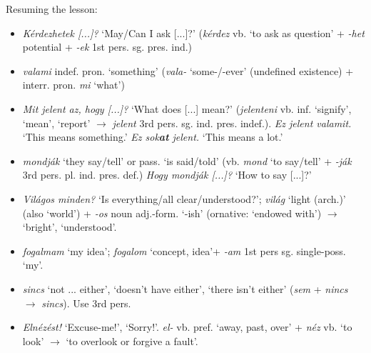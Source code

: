 \documentclass[a4paper,11pt]{article}
\begin{document}
\noindent Resuming the lesson:
\begin{itemize}

  \item \emph{Kérdezhetek [...]?} `May/Can I ask [...]?'
    (\emph{kérdez} vb. `to ask as question' + \emph{-het} potential +
    \emph{-ek} 1st pers. sg. pres. ind.)

  \item \emph{valami} indef. pron. `something' (\emph{vala-}
    `some-/-ever' (undefined existence) + interr. pron. \emph{mi}
    `what')

  \item \emph{Mit jelent az, hogy [...]?}  `What does [...] mean?'
    (\emph{jelenteni} vb. inf. `signify', `mean', `report'
    $\rightarrow$ \emph{jelent} 3rd
    pers. sg. ind. pres. indef.). \emph{Ez jelent valamit.} `This
    means something.' \emph{Ez sok\textbf{at} jelent.} `This means a
    lot.'

  \item \emph{mondják} `they say/tell' or pass. `is said/told'
    (vb. \emph{mond} `to say/tell' + \emph{-ják} 3rd
    pers. pl. ind. pres. def.) \emph{Hogy mondják [...]?} `How to say
    [...]?'

  \item \emph{Világos minden?} `Is everything/all clear/understood?';
    \emph{világ} `light (arch.)' (also `world') + \emph{-os} noun
    adj.-form. `-ish' (ornative: `endowed with') $\rightarrow$
    `bright', `understood'.

  \item \emph{fogalmam} `my idea'; \emph{fogalom} `concept, idea'+
    \emph{-am} 1st pers sg. single\hyp{}poss. `my'.

  \item \emph{sincs} `not ... either', `doesn't have either', `there
    isn't either' (\emph{sem} + \emph{nincs} $\rightarrow$
    \emph{sincs}). Use 3rd pers.

    \item \emph{Elnézést!} `Excuse-me!', `Sorry!'. \emph{el-}
      vb. pref. `away, past, over' + \emph{néz} vb. `to look'
      $\rightarrow$ `to overlook or forgive a fault'.
\end{itemize}
\end{document}
